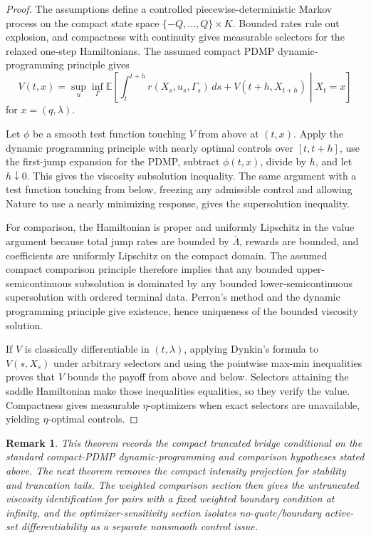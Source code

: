 \documentclass[11pt]{article}
\newtheorem{remark}[assumption]{Remark}
\newcommand{\E}{\mathbb{E}}
\begin{document}
\begin{proof}
The assumptions define a controlled piecewise-deterministic Markov process on
the compact state space
$\{-Q,\ldots,Q\}\times K$. Bounded rates rule out explosion, and compactness
with continuity gives measurable selectors for the relaxed one-step
Hamiltonians. The assumed compact PDMP dynamic-programming principle gives
\[
V(t,x)=
\sup_u\inf_\Gamma
\E\left[
\int_t^{t+h} r(X_s,u_s,\Gamma_s)\,ds+
V(t+h,X_{t+h})\middle|X_t=x
\right]
\]
for $x=(q,\lambda)$.

Let $\phi$ be a smooth test function touching $V$ from above at
$(t,x)$. Apply the dynamic programming principle with nearly optimal controls
over $[t,t+h]$, use the first-jump expansion for the PDMP, subtract
$\phi(t,x)$, divide by $h$, and let $h\downarrow0$. This gives the viscosity
subsolution inequality. The same argument with a test function touching from
below, freezing any admissible control and allowing Nature to use a nearly
minimizing response, gives the supersolution inequality.

For comparison, the Hamiltonian is proper and uniformly Lipschitz in the value
argument because total jump rates are bounded by $\bar\Lambda$, rewards are
bounded, and coefficients are uniformly Lipschitz on the compact domain. The
assumed compact comparison principle therefore implies that any bounded
upper-semicontinuous subsolution is dominated by any bounded
lower-semicontinuous supersolution with ordered terminal data. Perron's method
and the dynamic programming principle give existence, hence uniqueness of the
bounded viscosity solution.

If $V$ is classically differentiable in $(t,\lambda)$, applying Dynkin's
formula to $V(s,X_s)$ under arbitrary selectors and using the pointwise
max-min inequalities proves that $V$ bounds the payoff from above and below.
Selectors attaining the saddle Hamiltonian make those inequalities equalities,
so they verify the value. Compactness gives measurable $\eta$-optimizers when
exact selectors are unavailable, yielding $\eta$-optimal controls.
\end{proof}

\begin{remark}
This theorem records the compact truncated bridge conditional on the standard
compact-PDMP dynamic-programming and comparison hypotheses stated above. The
next theorem removes the compact intensity projection for stability and
truncation tails. The weighted comparison section then gives the untruncated
viscosity identification for pairs with a fixed weighted boundary condition at
infinity, and the optimizer-sensitivity section isolates no-quote/boundary
active-set differentiability as a separate nonsmooth control issue.
\end{remark}
\end{document}
